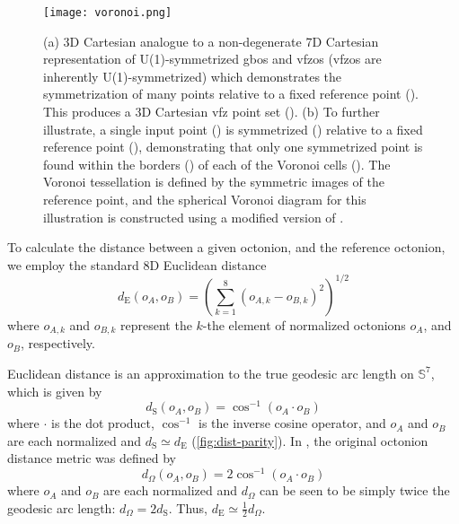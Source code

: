 \documentclass[final,twocolumn,12pt]{elsarticle}
\begin{document}
\begin{figure}
    \centering
    \texttt{[image: voronoi.png]}
    \caption{(a) 3D Cartesian analogue to a non-degenerate 7D Cartesian representation of U(1)-symmetrized \glspl{gbo} and \glspl{vfzo} (\glspl{vfzo} are inherently U(1)-symmetrized) which demonstrates the symmetrization of many points relative to a fixed reference point (). This produces a 3D Cartesian \gls{vfz} point set (\sympt{}). (b) To further illustrate, a single input point (\singlept{}) is symmetrized (\singlesympt{}) relative to a fixed reference point (), demonstrating that only one symmetrized point is found within the borders (\vbordercolor{}) of each of the Voronoi cells (\vcellcolor{}). The Voronoi tessellation is defined by the symmetric images of the reference point, and the spherical Voronoi diagram for this illustration is constructed using a modified version of \cite{luongVoronoiSphere2020}.}
    \label{fig:voronoi}
\end{figure}

To calculate the distance between a given octonion, and the reference octonion, we employ the standard 8D Euclidean distance
\begin{equation}
    \label{eq:8Deuclidean_dist}
    d_{\text{E}}\!\left(o_{A},o_{B}\right) = {\left(\sum_{k=1}^{8} {\left(o_{A,k} - o_{B,k}\right)}^2 \right)}^{1/2}
\end{equation}
where $o_{A,k}$ and $o_{B,k}$ represent the $k$-the element of normalized octonions $o_A$, and $o_B$, respectively. 

Euclidean distance is an approximation to the true geodesic arc length on $\mathbb{S}^7$, which is given by
\begin{equation}
    \label{eq:7sphere_arc_length}
    d_{\text{S}}\!\left(o_{A},o_{B}\right)=\cos ^{-1}\left(o_A\cdot o_B\right)
\end{equation}
where $\cdot$ is the dot product, $\cos ^{-1}$ is the inverse cosine operator, and $o_A$ and $o_B$ are each normalized and $d_{\text{S}}\simeq d_{\text{E}}$ (\cref{fig:dist-parity}). In \cite{francisGeodesicOctonionMetric2019}, the original octonion distance metric was defined by
\begin{equation}
    \label{eq:omega}
    d_\Omega\!\left(o_{A},o_{B}\right) = 2\cos ^{-1}\left(o_A\cdot o_B\right)
\end{equation}
where $o_A$ and $o_B$ are each normalized and $d_\Omega$ can be seen to be simply twice the geodesic arc length: $d_\Omega = 2 d_{\text{S}}$. Thus,
$d_\text{E}\simeq \frac{1}{2}d_\Omega$.
\end{document}
